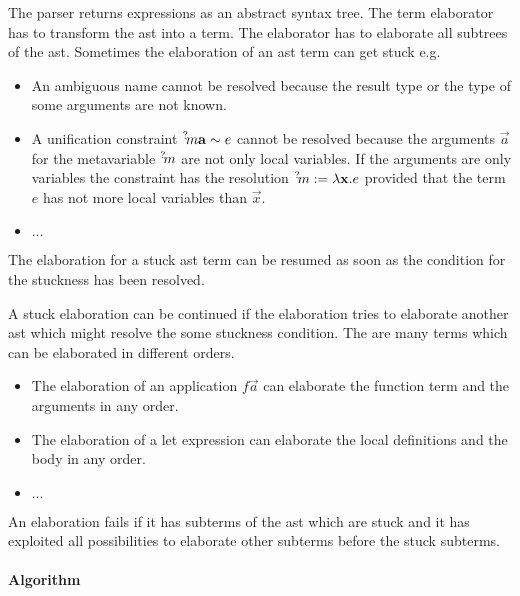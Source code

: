The parser returns expressions as an abstract syntax tree. The term elaborator
has to transform the ast into a  term. The elaborator has to elaborate all
subtrees of the ast. Sometimes the elaboration of an ast term can get stuck e.g.
\begin{itemize}
    \item An ambiguous name cannot be resolved because the result type or the
        type of some arguments are not known.

    \item A unification constraint ${{}^? \kern-0.2em m} {\mathbf a} \sim e$ cannot be resolved
        because the arguments $\vec a$ for the metavariable ${{}^? \kern-0.2em m}$ are not
        only local variables. If the arguments are only variables the constraint
        has the resolution ${{}^? \kern-0.2em m} := \lambda {\mathbf x}. e$ provided that the term
        $e$ has not more local variables than $\vec x$.

    \item $\ldots$
\end{itemize}

The elaboration for a stuck ast term can be resumed as soon as the condition for
the stuckness has been resolved.

A stuck elaboration can be continued if the elaboration tries to elaborate
another ast which might resolve the some stuckness condition. The are many terms
which can be elaborated in different orders.

\begin{itemize}
    \item The elaboration of an application $f \vec a$ can elaborate the
        function term and the arguments in any order.

    \item The elaboration of a let expression can elaborate the local
        definitions and the body in any order.

    \item $\ldots$
\end{itemize}

An elaboration fails if it has subterms of the ast which are stuck and it has
exploited all possibilities to elaborate other subterms before the stuck
subterms.


\paragraph{Algorithm}

